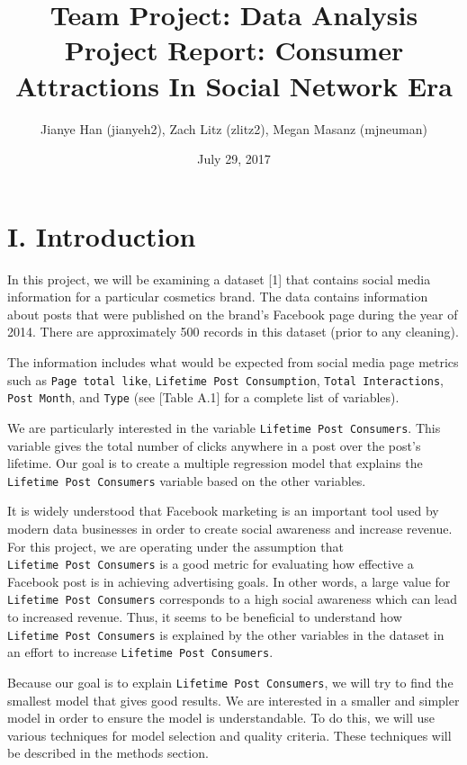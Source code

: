 \documentclass[
]{article}
\title{Team Project: Data Analysis Project Report: Consumer Attractions In
Social Network Era}
\author{Jianye Han (jianyeh2), Zach Litz (zlitz2), Megan Masanz (mjneuman)}
\date{July 29, 2017}
\begin{document}
\maketitle

\hypertarget{i.-introduction}{%
\section{\texorpdfstring{\textbf{I}.
Introduction}{I. Introduction}}\label{i.-introduction}}

In this project, we will be examining a dataset {[}1{]} that contains
social media information for a particular cosmetics brand. The data
contains information about posts that were published on the brand's
Facebook page during the year of 2014. There are approximately 500
records in this dataset (prior to any cleaning).

The information includes what would be expected from social media page
metrics such as \texttt{Page\ total\ like},
\texttt{Lifetime\ Post\ Consumption}, \texttt{Total\ Interactions},
\texttt{Post\ Month}, and \texttt{Type} (see {[}Table A.1{]} for a
complete list of variables).

We are particularly interested in the variable
\texttt{Lifetime\ Post\ Consumers}. This variable gives the total number
of clicks anywhere in a post over the post's lifetime. Our goal is to
create a multiple regression model that explains the
\texttt{Lifetime\ Post\ Consumers} variable based on the other
variables.

It is widely understood that Facebook marketing is an important tool
used by modern data businesses in order to create social awareness and
increase revenue. For this project, we are operating under the
assumption that \texttt{Lifetime\ Post\ Consumers} is a good metric for
evaluating how effective a Facebook post is in achieving advertising
goals. In other words, a large value for
\texttt{Lifetime\ Post\ Consumers} corresponds to a high social
awareness which can lead to increased revenue. Thus, it seems to be
beneficial to understand how \texttt{Lifetime\ Post\ Consumers} is
explained by the other variables in the dataset in an effort to increase
\texttt{Lifetime\ Post\ Consumers}.

Because our goal is to explain \texttt{Lifetime\ Post\ Consumers}, we
will try to find the smallest model that gives good results. We are
interested in a smaller and simpler model in order to ensure the model
is understandable. To do this, we will use various techniques for model
selection and quality criteria. These techniques will be described in
the methods section.
\end{document}
